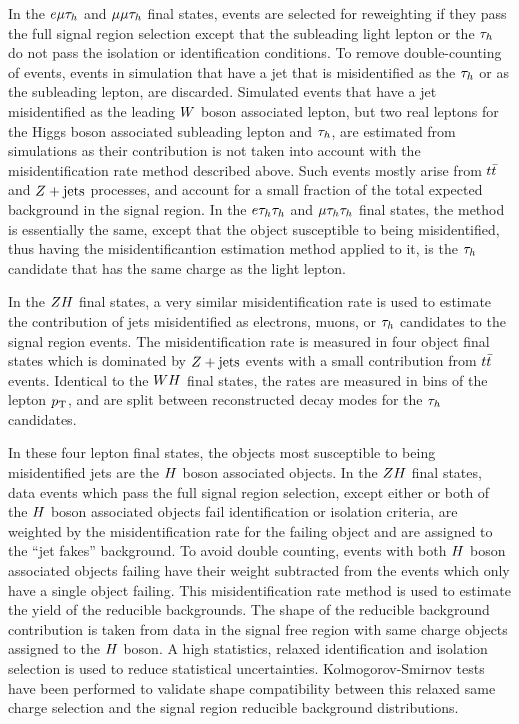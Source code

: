 In the $e\mu\tau_{h}$ and $\mu\mu\tau_{h}$ final states, 
events are selected for reweighting if they pass the full signal region 
selection except that the subleading light lepton or the $\tau_{h}$ do not 
pass the isolation or identification conditions.
To remove double-counting of events, events in simulation that have a jet that is 
misidentified as the $\tau_{h}$ or as the subleading lepton, are discarded. Simulated 
events that have a jet misidentified as the leading $W$ boson associated lepton, but two real leptons 
for the Higgs boson associated subleading lepton and $\tau_{h}$, are estimated from simulations as their 
contribution is not taken into account with the misidentification rate method 
described above. Such events mostly arise from $t\bar{t}$ and $Z+\textrm{jets}$ processes, 
and account for a small fraction of the total expected background in the signal region. 
In the $e\tau_{h}\tau_{h}$ and $\mu\tau_{h}\tau_{h}$ final states, 
the method is essentially the same, except that the object susceptible to being misidentified,
thus having the misidentificantion estimation method applied to it, 
is the $\tau_{h}$ candidate that has the same charge as the light lepton.  

In the $ZH$ final states, a very similar misidentification rate is used
to estimate the contribution of jets misidentified as electrons, muons, or $\tau_{h}$
candidates to the signal region events. The misidentification rate is measured in four object final states which
is dominated by $Z+\textrm{jets}$ events with a small contribution from 
$t\bar{t}$ events. Identical to the $WH$ final states, the rates are measured 
in bins of the lepton $p_\mathrm{T}$, and are split between reconstructed decay modes for 
the $\tau_{h}$ candidates. 

In these four lepton final states, the objects most susceptible 
to being misidentified jets are the $H$ boson associated objects.
In the $ZH$ final states, data events which pass the full
signal region selection, except either or both of the $H$ boson associated objects
fail identification or isolation criteria, are weighted by the misidentification
rate for the failing object and are assigned to the ``jet fakes'' background.
To avoid double counting, events with both $H$ boson associated objects failing have their weight
subtracted from the events which only have a single object failing. 
This misidentification rate method is used to estimate the yield of the reducible
backgrounds. The shape of the reducible background contribution is taken from
data in the signal free region with same charge objects assigned to the $H$ boson.
A high statistics, relaxed identification and isolation selection is used to reduce
statistical uncertainties. Kolmogorov-Smirnov tests have been performed to validate
shape compatibility between this relaxed same charge selection and the signal region
reducible background distributions.



